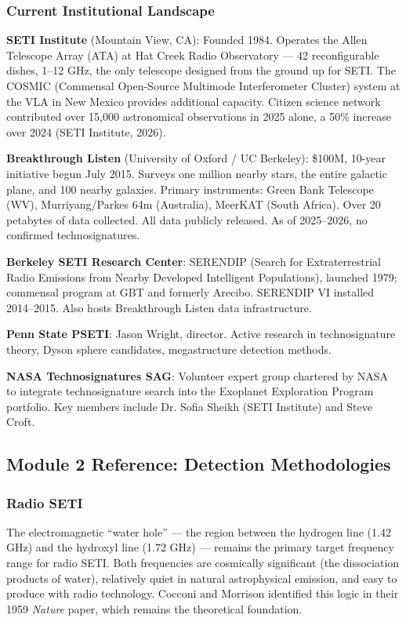 \documentclass[11pt,letterpaper]{article}
\begin{document}
\subsubsection{Current Institutional Landscape}

\textbf{SETI Institute} (Mountain View, CA): Founded 1984. Operates the Allen Telescope Array (ATA) at Hat Creek Radio Observatory --- 42 reconfigurable dishes, 1--12 GHz, the only telescope designed from the ground up for SETI. The COSMIC (Commensal Open-Source Multimode Interferometer Cluster) system at the VLA in New Mexico provides additional capacity. Citizen science network contributed over 15,000 astronomical observations in 2025 alone, a 50\% increase over 2024 (SETI Institute, 2026).

\textbf{Breakthrough Listen} (University of Oxford / UC Berkeley): \$100M, 10-year initiative begun July 2015. Surveys one million nearby stars, the entire galactic plane, and 100 nearby galaxies. Primary instruments: Green Bank Telescope (WV), Murriyang/Parkes 64m (Australia), MeerKAT (South Africa). Over 20 petabytes of data collected. All data publicly released. As of 2025--2026, no confirmed technosignatures.

\textbf{Berkeley SETI Research Center}: SERENDIP (Search for Extraterrestrial Radio Emissions from Nearby Developed Intelligent Populations), launched 1979; commensal program at GBT and formerly Arecibo. SERENDIP VI installed 2014--2015. Also hosts Breakthrough Listen data infrastructure.

\textbf{Penn State PSETI}: Jason Wright, director. Active research in technosignature theory, Dyson sphere candidates, megastructure detection methods.

\textbf{NASA Technosignatures SAG}: Volunteer expert group chartered by NASA to integrate technosignature search into the Exoplanet Exploration Program portfolio. Key members include Dr. Sofia Sheikh (SETI Institute) and Steve Croft.

\subsection{Module 2 Reference: Detection Methodologies}

\subsubsection{Radio SETI}

The electromagnetic ``water hole'' --- the region between the hydrogen line (1.42 GHz) and the hydroxyl line (1.72 GHz) --- remains the primary target frequency range for radio SETI. Both frequencies are cosmically significant (the dissociation products of water), relatively quiet in natural astrophysical emission, and easy to produce with radio technology. Cocconi and Morrison identified this logic in their 1959 \textit{Nature} paper, which remains the theoretical foundation.
\end{document}
